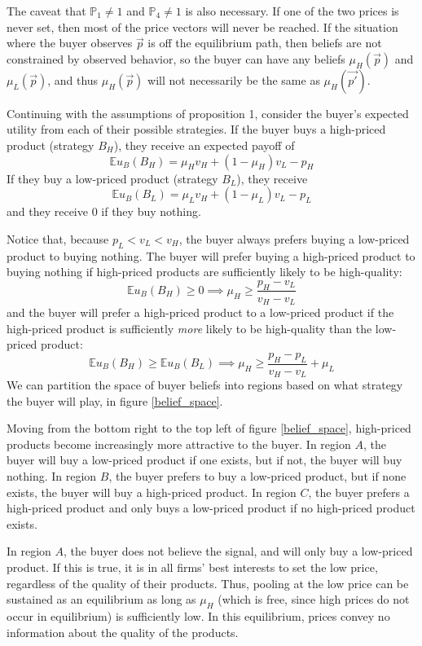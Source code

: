 \documentclass[12pt]{article}
\begin{document}
The caveat that $\mathbb{P}_1 \neq 1$ and $\mathbb{P}_4 \neq 1$ is also necessary. If one of the two prices is never set, then most of the price vectors will never be reached. If the situation where the buyer observes $\vec{p}$ is off the equilibrium path, then beliefs are not constrained by observed behavior, so the buyer can have any beliefs $\mu_H(\vec{p})$ and $\mu_L(\vec{p})$, and thus $\mu_H(\vec{p})$ will not necessarily be the same as $\mu_H(\vec{p'})$. 

Continuing with the assumptions of proposition 1, consider the buyer's expected utility from each of their possible strategies. If the buyer buys a high-priced product (strategy $B_H$), they receive an expected payoff of
\[ \mathbb{E} u_B(B_H) = \mu_H v_H + (1-\mu_H) v_L - p_H \]
If they buy a low-priced product (strategy $B_L$), they receive 
\[ \mathbb{E} u_B(B_L) = \mu_L v_H + (1-\mu_L) v_L - p_L \]
and they receive 0 if they buy nothing.

Notice that, because $p_L < v_L < v_H$, the buyer always prefers buying a low-priced product to buying nothing. The buyer will prefer buying a high-priced product to buying nothing if high-priced products are sufficiently likely to be high-quality:
\[ \mathbb{E} u_B(B_H) \geq 0 \implies \mu_H \geq \frac{p_H - v_L}{v_H - v_L} \]
and the buyer will prefer a high-priced product to a low-priced product if the high-priced product is sufficiently \emph{more} likely to be high-quality than the low-priced product:
\[ \mathbb{E} u_B(B_H) \geq \mathbb{E} u_B(B_L) \implies \mu_H \geq \frac{p_H - p_L}{v_H - v_L} + \mu_L \]
We can partition the space of buyer beliefs into regions based on what strategy the buyer will play, in figure \ref{belief_space}.



Moving from the bottom right to the top left of figure \ref{belief_space}, high-priced products become increasingly more attractive to the buyer. In region $A$, the buyer will buy a low-priced product if one exists, but if not, the buyer will buy nothing. In region $B$, the buyer prefers to buy a low-priced product, but if none exists, the buyer will buy a high-priced product. In region $C$, the buyer prefers a high-priced product and only buys a low-priced product if no high-priced product exists. 

In region $A$, the buyer does not believe the signal, and will only buy a low-priced product. If this is true, it is in all firms' best interests to set the low price, regardless of the quality of their products. Thus, pooling at the low price can be sustained as an equilibrium as long as $\mu_H$ (which is free, since high prices do not occur in equilibrium) is sufficiently low. In this equilibrium, prices convey no information about the quality of the products.
\end{document}
